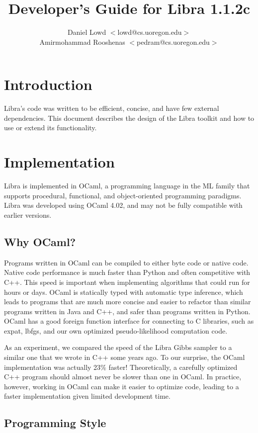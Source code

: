 \documentclass[11pt]{article}
\title{Developer's Guide for Libra 1.1.2c}
\author{Daniel Lowd $<$lowd@cs.uoregon.edu$>$\\
Amirmohammad Rooshenas $<$pedram@cs.uoregon.edu$>$}
\begin{document}
\maketitle

\section{Introduction}

Libra's code was written to be efficient, concise, and have few
external dependencies.  This document describes the design of the
Libra toolkit and how to use or extend its functionality.

\section{Implementation}

Libra is implemented in OCaml, a programming language in the ML family
that supports procedural, functional, and object-oriented programming
paradigms.  Libra was developed using OCaml 4.02, and may not be fully
compatible with earlier versions.

\subsection{Why OCaml?}

Programs written in OCaml can be compiled to either byte code or
native code.  Native code performance is much faster than Python and
often competitive with C++.  This speed is important when implementing
algorithms that could run for hours or days.  OCaml is statically
typed with automatic type inference, which leads to programs that are
much more concise and easier to refactor than similar programs written
in Java and C++, and safer than programs written in Python.  OCaml has
a good foreign function interface for connecting to C libraries, such
as expat, lbfgs, and our own optimized pseudo-likelihood computation
code.

As an experiment, we compared the speed of the Libra Gibbs sampler to
a similar one that we wrote in C++ some years ago.  To our surprise,
the OCaml implementation was actually 23\% faster!  Theoretically, a
carefully optimized C++ program should almost never be slower than one
in OCaml.  In practice, however, working in OCaml can make it easier
to optimize code, leading to a faster implementation given limited
development time.

\subsection{Programming Style}
\end{document}
